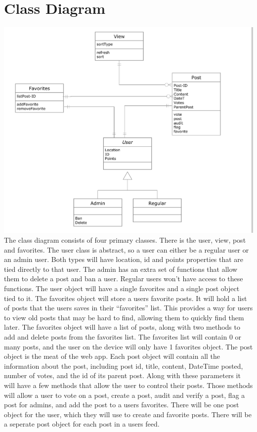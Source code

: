 \documentclass[12pt]{article}
\begin{document}
\section{Class Diagram}
\includegraphics[scale=0.85]{img/uml/ClassDiagram}
      The class diagram consists of four primary classes.  There is the user, view, post and favorites.  The user class is abstract, so a user can either be a regular user or an admin user.  Both types will have location, id and points properties that are tied directly to that user.  The admin has an extra set of functions that allow them to delete a post and ban a user.  Regular users won’t have access to these functions.  The user object will have a single favorites and a single post object tied to it. 
      The favorites object will store a users favorite posts.  It will hold a list of posts that the users saves in their “favorites” list.  This provides a way for users to view old posts that may be hard to find, allowing them to quickly find them later.  The favorites object will have a list of posts, along with two methods to add and delete posts from the favorites list.  The favorites list will contain 0 or many posts, and the user on the device will only have 1 favorites object.
      The post object is the meat of the web app.  Each post object will contain all the information about the post, including post id, title, content, DateTime posted, number of votes, and the id of its parent post.  Along with these parameters it will have a few methods that allow the user to control their posts.  Those methods will allow a user to vote on a post, create a post, audit and verify a post, flag a post for admins, and add the post to a users favorites.  There will be one post object for the user, which they will use to create and favorite posts.  There will be a seperate post object for each post in a users feed.
\end{document}
